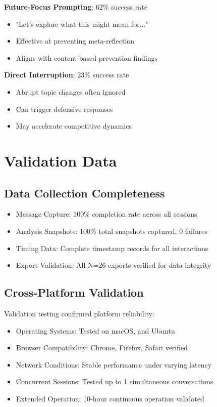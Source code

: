 \documentclass[11pt,letterpaper]{article}
\newcommand{\exponedataTotalSessionsRaw}{26}
\newcommand{\exponedataTotalSessions}{N=\exponedataTotalSessionsRaw}
\begin{document}
\textbf{Future-Focus Prompting}: 62\% success rate
\begin{itemize}
    \item "Let's explore what this might mean for..."
    \item Effective at preventing meta-reflection
    \item Aligns with content-based prevention findings
\end{itemize}

\textbf{Direct Interruption}: 23\% success rate
\begin{itemize}
    \item Abrupt topic changes often ignored
    \item Can trigger defensive responses
    \item May accelerate competitive dynamics
\end{itemize}

\section{Validation Data}
\label{app:performance}

\subsection{Data Collection Completeness}

\begin{itemize}
    \item Message Capture: 100\% completion rate across all sessions
    \item Analysis Snapshots: 100\% total snapshots captured, 0 failures
    \item Timing Data: Complete timestamp records for all interactions
    \item Export Validation: All \exponedataTotalSessions{} exports verified for data integrity
\end{itemize}

\subsection{Cross-Platform Validation}

Validation testing confirmed platform reliability:

\begin{itemize}
    \item Operating Systems: Tested on macOS, and Ubuntu
    \item Browser Compatibility: Chrome, Firefox, Safari verified
    \item Network Conditions: Stable performance under varying latency
    \item Concurrent Sessions: Tested up to 1 simultaneous conversations
    \item Extended Operation: 10-hour continuous operation validated
\end{itemize}
\end{document}
